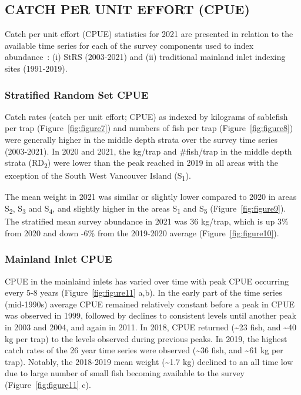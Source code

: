 \documentclass[12pt]{article}\usepackage[]{graphicx}\usepackage[]{color}
\begin{document}
\hypertarget{catch-per-unit-effort-cpue}{%
\subsection{CATCH PER UNIT EFFORT (CPUE)}\label{catch-per-unit-effort-cpue}}

Catch per unit effort (CPUE) statistics for 2021 are presented in relation to the available time series for each of the survey components used to index abundance~: (i) StRS (2003-2021) and (ii) traditional mainland inlet indexing sites (1991-2019).

\hypertarget{stratified-random-set-cpue}{%
\subsubsection{Stratified Random Set CPUE}\label{stratified-random-set-cpue}}

Catch rates (catch per unit effort; CPUE) as indexed by kilograms of sablefish per trap (Figure~\ref{fig:figure7}) and numbers of fish per trap (Figure~\ref{fig:figure8}) were generally higher in the middle depth strata over the survey time series (2003-2021). In 2020 and 2021, the kg/trap and \#fish/trap in the middle depth strata (RD\textsubscript{2}) were lower than the peak reached in 2019 in all areas with the exception of the South West Vancouver Island (S\textsubscript{1}).

The mean weight in 2021 was similar or slightly lower compared to 2020 in areas S\textsubscript{2}, S\textsubscript{3} and S\textsubscript{4}, and slightly higher in the areas S\textsubscript{1} and S\textsubscript{5} (Figure~\ref{fig:figure9}). The stratified mean survey abundance in 2021 was 36 kg/trap, which is up 3\% from 2020 and down -6\% from the 2019-2020 average (Figure~\ref{fig:figure10}).

\hypertarget{mainland-inlet-cpue}{%
\subsubsection{Mainland Inlet CPUE}\label{mainland-inlet-cpue}}

CPUE in the mainlaind inlets has varied over time with peak CPUE occurring every 5-8 years (Figure~\ref{fig:figure11} a,b). In the early part of the time series (mid-1990s) average CPUE remained relatively constant before a peak in CPUE was observed in 1999, followed by declines to consistent levels until another peak in 2003 and 2004, and again in 2011. In 2018, CPUE returned (\textasciitilde23 fish, and \textasciitilde40 kg per trap) to the levels observed during previous peaks. In 2019, the highest catch rates of the 26 year time series were observed (\textasciitilde36 fish, and \textasciitilde61 kg per trap). Notably, the 2018-2019 mean weight (\textasciitilde1.7 kg) declined to an all time low due to large number of small fish becoming available to the survey (Figure~\ref{fig:figure11} c).
\end{document}
